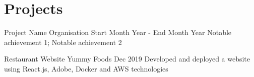 \section*{Projects}

\componentlist
    {Project Name}
    {Organisation}
    {Start Month Year - End Month Year}
    {
        Notable achievement 1;
        Notable achievement 2
    }

\componentlist
    {Restaurant Website}
    {Yummy Foods}
    {Dec 2019}
    {
        Developed and deployed a website using React.js, Adobe, Docker and AWS technologies
    }

